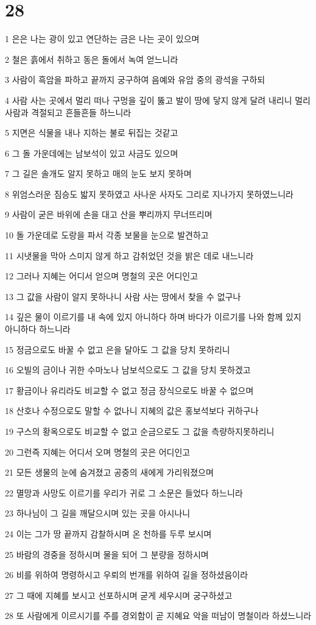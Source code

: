 \chapter{28}

\par 1 은은 나는 광이 있고 연단하는 금은 나는 곳이 있으며
\par 2 철은 흙에서 취하고 동은 돌에서 녹여 얻느니라
\par 3 사람이 흑암을 파하고 끝까지 궁구하여 음예와 유암 중의 광석을 구하되
\par 4 사람 사는 곳에서 멀리 떠나 구멍을 깊이 뚫고 발이 땅에 닿지 않게 달려 내리니 멀리 사람과 격절되고 흔들흔들 하느니라
\par 5 지면은 식물을 내나 지하는 불로 뒤집는 것같고
\par 6 그 돌 가운데에는 남보석이 있고 사금도 있으며
\par 7 그 길은 솔개도 알지 못하고 매의 눈도 보지 못하며
\par 8 위엄스러운 짐승도 밟지 못하였고 사나운 사자도 그리로 지나가지 못하였느니라
\par 9 사람이 굳은 바위에 손을 대고 산을 뿌리까지 무너뜨리며
\par 10 돌 가운데로 도랑을 파서 각종 보물을 눈으로 발견하고
\par 11 시냇물을 막아 스미지 않게 하고 감취었던 것을 밝은 데로 내느니라
\par 12 그러나 지혜는 어디서 얻으며 명철의 곳은 어디인고
\par 13 그 값을 사람이 알지 못하나니 사람 사는 땅에서 찾을 수 없구나
\par 14 깊은 물이 이르기를 내 속에 있지 아니하다 하며 바다가 이르기를 나와 함께 있지 아니하다 하느니라
\par 15 정금으로도 바꿀 수 없고 은을 달아도 그 값을 당치 못하리니
\par 16 오빌의 금이나 귀한 수마노나 남보석으로도 그 값을 당치 못하겠고
\par 17 황금이나 유리라도 비교할 수 없고 정금 장식으로도 바꿀 수 없으며
\par 18 산호나 수정으로도 말할 수 없나니 지혜의 값은 홍보석보다 귀하구나
\par 19 구스의 황옥으로도 비교할 수 없고 순금으로도 그 값을 측량하지못하리니
\par 20 그런즉 지혜는 어디서 오며 명철의 곳은 어디인고
\par 21 모든 생물의 눈에 숨겨졌고 공중의 새에게 가리워졌으며
\par 22 멸망과 사망도 이르기를 우리가 귀로 그 소문은 들었다 하느니라
\par 23 하나님이 그 길을 깨달으시며 있는 곳을 아시나니
\par 24 이는 그가 땅 끝까지 감찰하시며 온 천하를 두루 보시며
\par 25 바람의 경중을 정하시며 물을 되어 그 분량을 정하시며
\par 26 비를 위하여 명령하시고 우뢰의 번개를 위하여 길을 정하셨음이라
\par 27 그 때에 지혜를 보시고 선포하시며 굳게 세우시며 궁구하셨고
\par 28 또 사람에게 이르시기를 주를 경외함이 곧 지혜요 악을 떠남이 명철이라 하셨느니라

